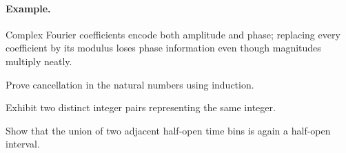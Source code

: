 \paragraph{Example.} Complex Fourier coefficients encode both amplitude and phase; replacing every coefficient by its modulus loses phase information even though magnitudes multiply neatly.

\begin{exercises}
\item Prove cancellation in the natural numbers using induction.
\item Exhibit two distinct integer pairs representing the same integer.
\item Show that the union of two adjacent half-open time bins is again a half-open interval.
\end{exercises}